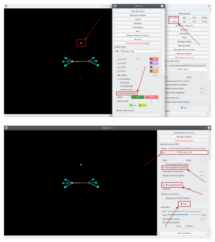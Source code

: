 \documentclass[a4paper,10pt]{article}
\begin{document}
\begin{minipage}{.5\linewidth}
\begin{figure}[H]
\caption{\label{fig:57}}
\begin{center}
\includegraphics[width=0.95\linewidth]{damqt_QS_fig57_b.png}
\end{center}
\end{figure} 
\end{minipage}
\begin{minipage}{.5\linewidth}
\begin{figure}[H]
\caption{\label{fig:58}}
\begin{center}
\includegraphics[width=0.95\linewidth]{damqt_QS_fig58_b.png}
\end{center}
\end{figure} 
\end{minipage}
\end{document}
